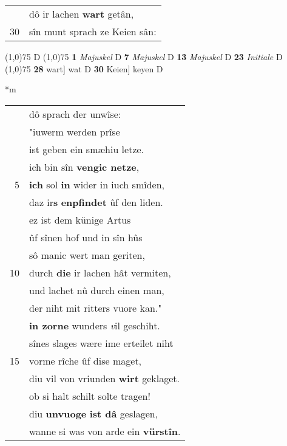 \documentclass[8pt,a4paper,notitlepage]{article}
\begin{document}
\begin{table}[ht]
\begin{minipage}[t]{0.5\linewidth}
\begin{tabular}{rl}
 & dô ir lachen \textbf{wart} getân,\\ 
30 & sîn munt sprach ze Keien sân:\\ 
\end{tabular}
\scriptsize
\line(1,0){75} \newline
D \newline
\line(1,0){75} \newline
\textbf{1} \textit{Majuskel} D  \textbf{7} \textit{Majuskel} D  \textbf{13} \textit{Majuskel} D  \textbf{23} \textit{Initiale} D  \newline
\line(1,0){75} \newline
\textbf{28} wart] wat D \textbf{30} Keien] keyen D \newline
\end{minipage}
\hspace{0.5cm}
\begin{minipage}[t]{0.5\linewidth}
\small
\begin{center}*m
\end{center}
\begin{tabular}{rl}
 & dô sprach der unwîse:\\ 
 & "iuwerm werden prîse\\ 
 & ist geben ein smæhiu letze.\\ 
 & ich bin sîn \textbf{vengic netze},\\ 
5 & \textbf{ich} sol \textbf{in} wider in iuch smîden,\\ 
 & daz ir\textbf{s} \textbf{enpfindet} ûf den liden.\\ 
 & ez ist dem künige Artus\\ 
 & ûf sînen hof und in sîn hûs\\ 
 & sô manic wert man geriten,\\ 
10 & durch \textbf{die} ir lachen hât vermiten,\\ 
 & und lachet nû durch einen man,\\ 
 & der niht mit ritters vuore kan."\\ 
 & \textbf{in zorne} wunders \textit{v}il geschiht.\\ 
 & sînes slages wære ime erteilet niht\\ 
15 & vorme rîche ûf dise maget,\\ 
 & diu vil von vriunden \textbf{wirt} geklaget.\\ 
 & ob si halt schilt solte tragen!\\ 
 & diu \textbf{unvuoge} \textbf{ist dâ} geslagen,\\ 
 & wanne si was von arde ein \textbf{vürstîn}.\\ 

\end{tabular}
\end{minipage}
\end{table}
\end{document}
